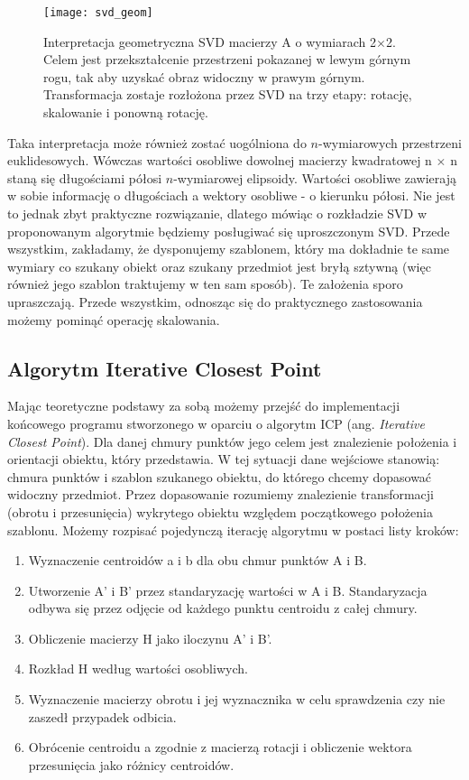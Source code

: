 \documentclass{article}
\begin{document}
\begin{figure}[h]
\centering
\texttt{[image: svd\_geom]}
\caption{Interpretacja geometryczna SVD macierzy A o wymiarach 2$\times$2. Celem jest przekształcenie przestrzeni pokazanej w lewym górnym rogu, tak aby uzyskać obraz widoczny w prawym górnym. Transformacja zostaje rozłożona przez SVD na trzy etapy: rotację, skalowanie i ponowną rotację.}
\end{figure}

Taka interpretacja może również zostać uogólniona do $n$-wymiarowych przestrzeni euklidesowych. Wówczas wartości osobliwe dowolnej macierzy kwadratowej n $\times$ n staną się długościami półosi $n$-wymiarowej elipsoidy. Wartości osobliwe zawierają w sobie informację o długościach a wektory osobliwe - o kierunku półosi. Nie jest to jednak zbyt praktyczne rozwiązanie, dlatego mówiąc o rozkładzie SVD w proponowanym algorytmie będziemy posługiwać się uproszczonym SVD. Przede wszystkim, zakładamy, że dysponujemy szablonem, który ma dokładnie te same wymiary co szukany obiekt oraz szukany przedmiot jest bryłą sztywną (więc również jego szablon traktujemy w ten sam sposób). Te założenia sporo upraszczają. Przede wszystkim, odnosząc się do praktycznego zastosowania możemy pominąć operację skalowania.

\subsection{\LARGE{Algorytm Iterative Closest Point}}
Mając teoretyczne podstawy za sobą możemy przejść do implementacji końcowego programu stworzonego w oparciu o algorytm ICP (ang. \emph{Iterative Closest Point}). Dla danej chmury punktów jego celem jest znalezienie położenia i orientacji obiektu, który przedstawia. W tej sytuacji dane wejściowe stanowią: chmura punktów i szablon szukanego obiektu, do którego chcemy dopasować widoczny przedmiot. Przez dopasowanie rozumiemy znalezienie transformacji (obrotu i przesunięcia) wykrytego obiektu względem początkowego położenia szablonu. Możemy rozpisać pojedynczą iterację algorytmu w postaci listy kroków:

\begin{enumerate}
\item Wyznaczenie centroidów a i b dla obu chmur punktów A i B.
\item Utworzenie A' i B' przez standaryzację wartości w A i B. Standaryzacja odbywa się przez  odjęcie od każdego punktu centroidu z całej chmury.
\item Obliczenie macierzy H jako iloczynu A' i B'.
\item Rozkład H według wartości osobliwych.
\item Wyznaczenie macierzy obrotu i jej wyznacznika w celu sprawdzenia czy nie zaszedł przypadek odbicia.
\item Obrócenie centroidu a zgodnie z macierzą rotacji i obliczenie wektora przesunięcia jako różnicy centroidów. 
\end{enumerate}
\end{document}
